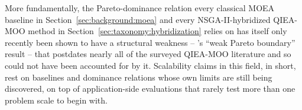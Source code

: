 More fundamentally, the
Pareto-dominance relation every classical MOEA baseline in
Section~\ref{sec:background:moea} and every NSGA-II-hybridized QIEA-MOO
method in Section~\ref{sec:taxonomy:hybridization} relies on has itself
only recently been shown to have a structural weakness --
\citet{zheng2025weakparetoboundary}'s ``weak Pareto boundary'' result --
that postdates nearly all of the surveyed QIEA-MOO literature and so
could not have been accounted for by it. Scalability claims in this field, in short, rest on baselines and
dominance relations whose own limits are still being discovered, on top
of application-side evaluations that rarely test more than one problem
scale to begin with.
